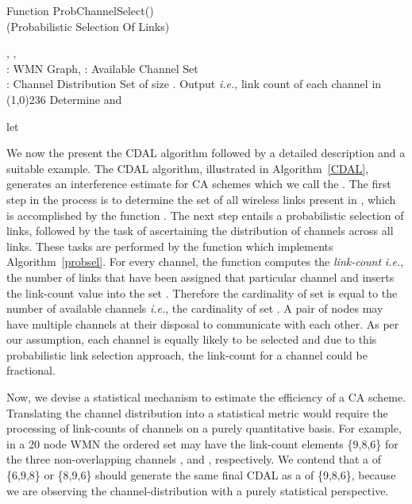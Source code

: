 \documentclass[conference]{IEEEtran}
\begin{document}
\renewcommand{\algorithmicrequire}{\textbf{Input:}}
\renewcommand{\algorithmicensure}{\textbf{Output:}}
\begin{algorithm}[htb!] 
\caption{Function ProbChannelSelect()\\ (Probabilistic Selection Of Links)}
\label{probsel}
\begin{algorithmic}[1]
{\fontsize{9}{10}
\REQUIRE, ,  \\
  : WMN Graph,  : Available Channel Set\\
  : Channel Distribution Set of size . 
\ENSURE Output  \emph{i.e.}, link count of each channel in  \\
\line(1,0){236}
\FOR {}
\STATE Determine  and  
\ENDFOR

\FOR {}
\FOR {}
\STATE   {}
\STATE let 
\FOR {}
\STATE 
{}
\ENDFOR
\ENDFOR
\ENDFOR
}
\end{algorithmic}
\end{algorithm}




We now the present the CDAL algorithm followed by a detailed description and a suitable example. The CDAL algorithm, illustrated in Algorithm~\ref{CDAL}, generates an interference estimate for CA schemes which we call the . The first step in the process is to determine the set of all wireless links present in , which is accomplished by the function . The next step entails a probabilistic selection of links, followed by the task of ascertaining the distribution of channels across all links. These tasks are performed by the function  which implements Algorithm~\ref{probsel}. For every channel, the function computes the \textit{link-count} \textit{i.e.}, the number of links that have been assigned that particular channel and inserts the link-count value into the set . Therefore the cardinality of set  is equal to the number of available channels \emph{i.e.}, the cardinality of set . A pair of nodes may have multiple channels at their disposal to 
communicate with each other. As per our assumption, each channel is equally likely to be selected and due to this probabilistic link selection approach, the link-count for a channel could be fractional.

Now, we devise a statistical mechanism to estimate the efficiency of a CA scheme. Translating the channel distribution into a statistical metric would require the processing of link-counts of channels on a purely quantitative basis. For example, in a 20 node WMN the ordered set  may have the link-count elements \{9,8,6\} for the three non-overlapping channels ,  and , respectively. We contend that a  of \{6,9,8\} or \{8,9,6\} should generate the same final CDAL as a  of \{9,8,6\}, because we are observing the channel-distribution with a purely statistical perspective. 
\end{document}
